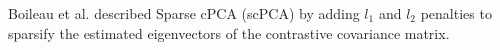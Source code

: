 \documentclass[12pt]{article}
\begin{document}
Boileau et al.  \cite{Boileau} described Sparse cPCA (scPCA) by adding $l_1$ and $l_2$ penalties to sparsify the estimated eigenvectors of the contrastive covariance matrix. %
\end{document}
